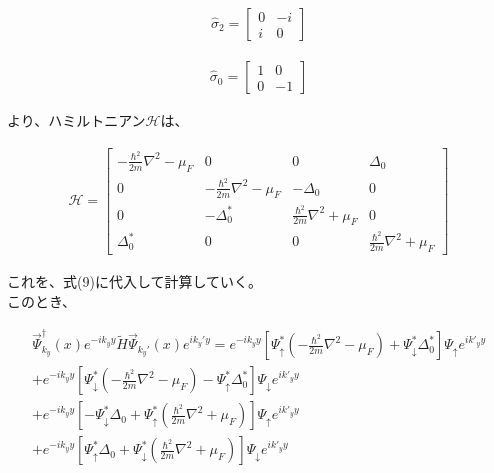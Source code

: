 \documentclass{jsarticle}
\begin{document}
		\begin{align}
			\hat{\sigma}_2=
			\begin{bmatrix}
				0 & -i \\ 
				i & 0
			\end{bmatrix}
		\end{align}
		
		\begin{align}
			\hat{\sigma}_0=
			\begin{bmatrix}
				1 & 0 \\ 
				0 & -1
			\end{bmatrix}  
		\end{align}
		
		より、ハミルトニアン$\mathcal{H}$は、
		
		\begin{align}
			\mathcal{H}=
			\begin{bmatrix}
				-\frac{\hbar^2}{2m}\nabla^2-\mu_F & 0 & 0 & \Delta_0 \\ 
				0 & -\frac{\hbar^2}{2m}\nabla^2-\mu_F & -\Delta_0 & 0 \\ 
				0 & -\Delta_0^\ast & \frac{\hbar^2}{2m}\nabla^2+\mu_F & 0 \\ 
				\Delta_0^\ast & 0 & 0 & \frac{\hbar^2}{2m}\nabla^2+\mu_F
			\end{bmatrix} 
		\end{align}
		
		これを、式(9)に代入して計算していく。　\\
		このとき、
		
		\begin{align}
			\vec{\Psi}_{k_y}^\dagger(x) e^{-ik_yy} \tilde{H}  \vec{\Psi}_{k_y'}(x) e^{ik_y'y} = 
			e^{-ik_yy} \left[ \Psi_\uparrow^\ast \left( -\frac{\hbar^2}{2m}\nabla^2-\mu_F \right) +\Psi_\downarrow^\ast \Delta_0^\ast \right] \Psi_\uparrow e^{ik'_yy} \nonumber\\
			+e^{-ik_yy} \left[ \Psi_\downarrow^\ast \left( -\frac{\hbar^2}{2m}\nabla^2-\mu_F \right) -\Psi_\uparrow^\ast \Delta_0^\ast \right] \Psi_\downarrow e^{ik'_yy} \nonumber\\
			+ e^{-ik_yy} \left[ -\Psi_\downarrow^\ast\Delta_0 +\Psi_\uparrow^\ast \left( \frac{\hbar^2}{2m}\nabla^2+\mu_F \right) \right] \Psi_\uparrow e^{ik'_yy} \nonumber\\
			+e^{-ik_yy} \left[ \Psi_\uparrow^\ast\Delta_0 +\Psi_\downarrow^\ast \left( \frac{\hbar^2}{2m}\nabla^2+\mu_F \right) \right] \Psi_\downarrow e^{ik'_yy}
		\end{align}
		
\end{document}
